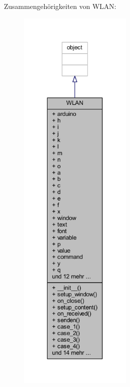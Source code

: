 Zusammengehörigkeiten von W\+L\+AN\+:
\nopagebreak
\begin{figure}[H]
\begin{center}
\leavevmode
\includegraphics[height=550pt]{class_f_i_n_a_l___g_u_i___w_l_a_n_1_1_w_l_a_n__coll__graph}
\end{center}
\end{figure}
